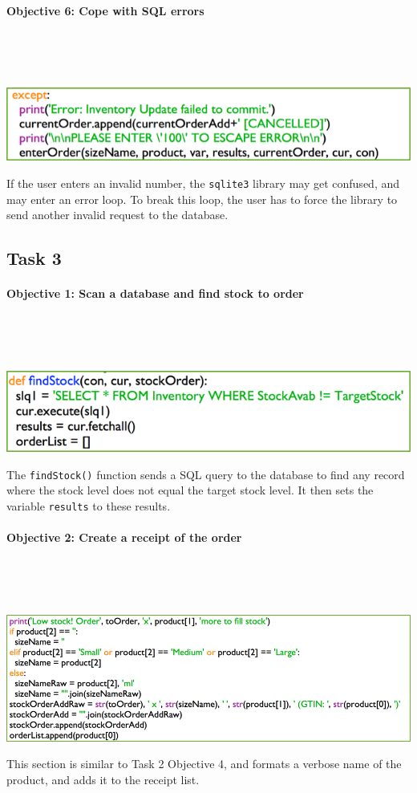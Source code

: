 \documentclass[a4paper]{article}
\begin{document}
\paragraph{Objective 6: Cope with SQL errors} ~\par ~\par
\noindent\includegraphics{task2_obj6_1.png} \par
If the user enters an invalid number, the \verb|sqlite3| library may get confused, and may enter an error loop. To break this loop, the user has to force the library to send another invalid request to the database.

\newpage
\subsection{Task 3}
\paragraph{Objective 1: Scan a database and find stock to order} ~\par ~\par
\noindent\includegraphics{task3_obj1_1.png} \par 
The \verb|findStock()| function sends a SQL query to the database to find any record where the stock level does not equal the target stock level. It then sets the variable \verb?results? to these results.
\paragraph{Objective 2: Create a receipt of the order} ~\par ~\par
\noindent\includegraphics{task3_obj2_1.png} \par 
This section is similar to Task 2 Objective 4, and formats a verbose name of the product, and adds it to the receipt list.
\end{document}
